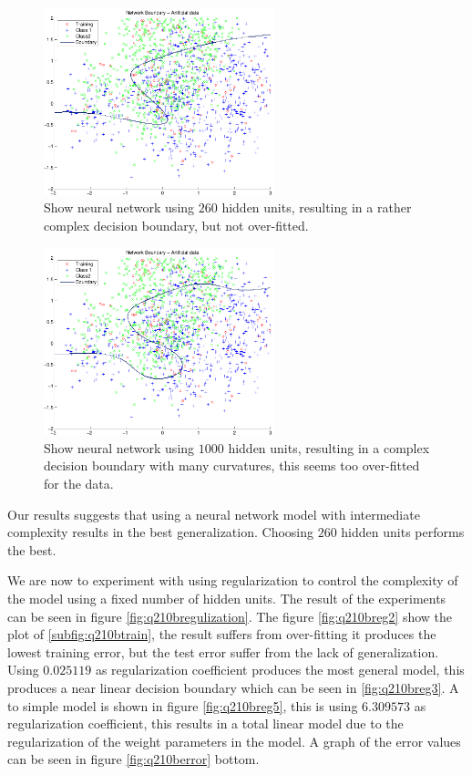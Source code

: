 \begin{figure}[!htbp]
  \centering
  \includegraphics[width=0.6\textwidth]{./images/q210a_Nh260}
  \caption{Show neural network using $260$ hidden units, resulting in
    a rather complex decision boundary, but not over-fitted.}
  \label{fig:q210Nh260}
\end{figure}

\begin{figure}[!htbp]
  \centering
  \includegraphics[width=0.6\textwidth]{./images/q210a_Nh1000}
  \caption{Show neural network using $1000$ hidden units, resulting in
    a complex decision boundary with many curvatures, this seems too
    over-fitted for the data.}
  \label{fig:q210Nh1000}
\end{figure}

Our results suggests that using a neural network model with
intermediate complexity results in the best generalization. Choosing
$260$ hidden units performs the best.

We are now to experiment with using regularization to control the
complexity of the model using a fixed number of hidden units. The
result of the experiments can be seen in figure
\ref{fig:q210bregulization}. The figure \ref{fig:q210breg2} show the
plot of \ref{subfig:q210btrain}, the result suffers from over-fitting
it produces the lowest training error, but the test error suffer from
the lack of generalization. Using $0.025119$ as regularization
coefficient produces the most general model, this produces a near
linear decision boundary which can be seen in \ref{fig:q210breg3}. A
to simple model is shown in figure \ref{fig:q210breg5}, this is using
$6.309573$ as regularization coefficient, this results in a total linear
model due to the regularization of the weight parameters in the model. A
graph of the error values can be seen in figure \ref{fig:q210berror}
bottom.

